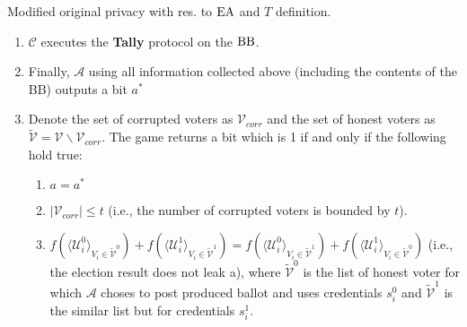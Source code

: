 \begin{definition}{ Modified original privacy with res. to $\operatorname{EA}$ and $T$ definition.}
\begin{enumerate}
\begin{enumerate}
\item[] -- $\mathcal{A}$ choses whether to post the produced ballot $b_i$ to the $\bb$ or not. 
\end{enumerate}
\item $\mathcal{C}$ executes the \textbf{Tally} protocol on the $\bb$. 
\item Finally, $\mathcal{A}$ using all information collected above (including the contents of the BB) outputs a bit $a^*$
\item Denote the set of corrupted voters as $\mathcal{V}_{corr}$ and the set of honest voters as $\tilde{\mathcal{V}}= \mathcal{V} \backslash \mathcal{V}_{corr}$. The game returns a bit which is 1 if and only if the following hold true:
\begin{enumerate}
 \item $a = a^*$
 \item $|\mathcal{V}_{corr}| \leq t$ (i.e., the number of corrupted voters is bounded by $t$).
 \item $f(\langle \mathcal{U}^0_i \rangle _{V_i \in \tilde{\mathcal{V}}^0} ) + f(\langle \mathcal{U}^1_i \rangle _{V_i \in \tilde{\mathcal{V}}^1} ) =  f(\langle \mathcal{U}^0_i \rangle _{V_i \in \tilde{\mathcal{V}}^1} ) +  f(\langle \mathcal{U}^1_i \rangle _{V_i \in \tilde{\mathcal{V}}^0} )$ (i.e., the election result does not leak a), where  $ \tilde{\mathcal{V}}^0$ is the list of honest voter for which $\mathcal{A}$ choses to post produced ballot and uses credentials $s_i^0$  and $ \tilde{\mathcal{V}}^1$ is the similar list but for credentials $s_i^1$. 
  \end{enumerate} 
\end{enumerate}
\end{definition}

